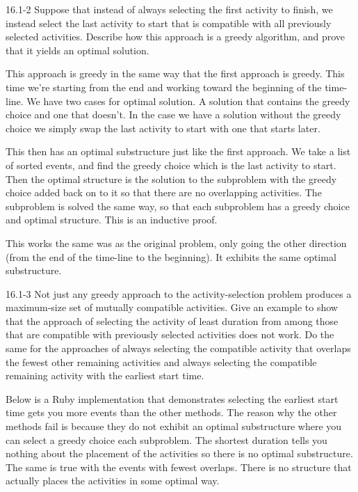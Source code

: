 \begin{problem}{16.1-2}
  Suppose that instead of always selecting the first activity to finish, we instead select the last activity to start
  that is compatible with all previously selected activities. Describe how this approach is a greedy algorithm, and
  prove that it yields an optimal solution.
  \begin{solution}
    This approach is greedy in the same way that the first approach is greedy. This time we're starting from the end and
    working toward the beginning of the time-line. We have two cases for optimal solution. A solution that contains the
    greedy choice and one that doesn't. In the case we have a solution without the greedy choice we simply swap the last
    activity to start with one that starts later.

    This then has an optimal substructure just like the first approach. We take a list of sorted events, and find the
    greedy choice which is the last activity to start. Then the optimal structure is the solution to the subproblem with
    the greedy choice added back on to it so that there are no overlapping activities. The subproblem is solved the same
    way, so that each subproblem has a greedy choice and optimal structure. This is an inductive proof.

    This works the same was as the original problem, only going the other direction (from the end of the time-line to the
    beginning). It exhibits the same optimal substructure.
  \end{solution}
\end{problem}

\begin{problem}{16.1-3}
  Not just any greedy approach to the activity-selection problem produces a maximum-size set of mutually compatible
  activities. Give an example to show that the approach of selecting the activity of least duration from among those
  that are compatible with previously selected activities does not work. Do the same for the approaches of always
  selecting the compatible activity that overlaps the fewest other remaining activities and always selecting the
  compatible remaining activity with the earliest start time.
  \begin{solution}
    Below is a Ruby implementation that demonstrates selecting the earliest start time gets you more events than the
    other methods. The reason why the other methods fail is because they do not exhibit an optimal substructure where
    you can select a greedy choice each subproblem. The shortest duration tells you nothing about the placement of the
    activities so there is no optimal substructure. The same is true with the events with fewest overlaps. There is no
    structure that actually places the activities in some optimal way.
    
  \end{solution}
\end{problem}


